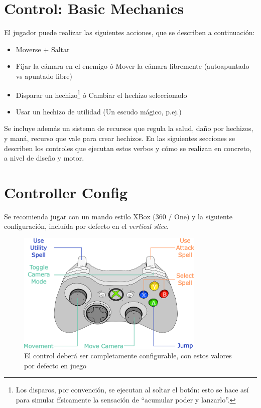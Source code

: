 \documentclass[12pt]{report}
\begin{document}
\section{Control: Basic Mechanics}

El jugador puede realizar las siguientes acciones, que se describen a continuación:

\begin{itemize}
	\item Moverse + Saltar
	\item Fijar la cámara en el enemigo ó Mover la cámara libremente (autoapuntado vs apuntado libre)
	\item Disparar un hechizo\footnote{Los disparos, por convención, se ejecutan al soltar el botón: esto se hace así para simular físicamente la sensación de ``acumular poder y lanzarlo''.} ó Cambiar el hechizo seleccionado
	\item Usar un hechizo de utilidad (Un escudo mágico, p.ej.)
\end{itemize}

Se incluye además un sistema de recursos que regula la salud, daño por hechizos, y maná, recurso que vale para crear hechizos. En las siguientes secciones se describen los controles que ejecutan estos verbos y cómo se realizan en concreto, a nivel de diseño y motor.

\section{Controller Config}
\label{control1}

Se recomienda jugar con un mando estilo XBox (360 / One) y la siguiente configuración, incluída por defecto en el \textit{vertical slice}.

\begin{figure}[h]
    \centering
    \includegraphics[width=0.8\textwidth]{controller}
	\captionsetup{labelformat=empty}
    \caption{El control deberá ser completamente configurable, con estos valores por defecto en juego}
\end{figure}
\end{document}
